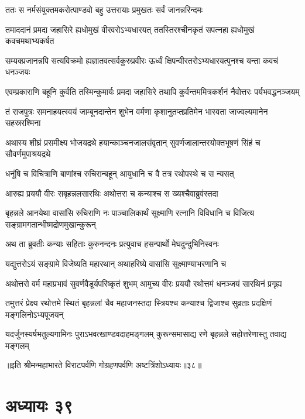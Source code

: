 
\twolineshloka
{ततः स नर्मसंयुक्तमकरोत्पाण्डवो बहु}
{उत्तरायाः प्रमुखतः सर्वं जानन्नरिन्दमः}


\twolineshloka
{तमाददानं प्रमदा जहासिरे ह्यधोमुखं वीरवरोऽभ्यधारयत्}
{ततस्तिरश्चीनकृतं सपत्नहा ह्यधोमुखं कवचमथाभ्यकर्षत}


\twolineshloka
{सम्यक्प्रजानन्नपि सत्यविक्रमो ह्यज्ञातवत्सर्वकुरुप्रवीरः}
{ऊर्ध्वं क्षिपन्वीरतरोऽभ्यधारयत्पुनश्च यन्ता कवचं धनञ्जयः}


\twolineshloka
{एवम्प्रकाराणि बहूनि कुर्वति तस्मिन्कुमार्यः प्रमदा जहासिरे}
{तथापि कुर्वन्तममित्रकर्शनं नैवोत्तरः पर्यभवद्धनञ्जयम्}


\twolineshloka
{तं राजपुत्रः समनाहयत्स्वयं जाम्बूनदान्तेन शुभेन वर्मणा}
{कृशानुतप्तप्रतिमेन भास्वता जाज्वल्यमानेन सहस्ररश्मिना}


\twolineshloka
{अथास्य शीघ्रं प्रसमीक्ष्य भोजयद्रथे हयान्काञ्चनजालसंवृतान्}
{सुवर्णजालान्तरयोक्तभूषणं सिंहं च सौवर्णमुपाश्रयद्रथे}


\twolineshloka
{धनूंषि च विचित्राणि बाणांश्च रुचिरान्बहून्}
{आयुधानि च वै तत्र रथोपस्थे च स न्यसत्}


\twolineshloka
{आरुह्य प्रययौ वीरः सबृहन्नलसारथिः}
{अथोत्तरा च कन्याश्च स ख्यश्चैवाब्रुवंस्तदा}


\threelineshloka
{बृहन्नले आनयेथा वासांसि रुचिराणि नः}
{पाञ्चालिकार्थं सूक्ष्माणि रत्नानि विविधानि च}
{विजित्य सङ्ग्रामगतान्भीष्मद्रोणमुखान्कुरून्}


\twolineshloka
{अथ ता ब्रुवतीः कन्याः सहिताः कुरुनन्दनः}
{प्रत्युवाच हसन्पार्थो मेघदुन्दुभिनिस्वनः}


\twolineshloka
{यद्युत्तरोऽयं सङ्ग्रामे विजेष्यति महारथान्}
{अथाहरिष्ये वासांसि सूक्ष्माण्याभरणानि च}



\twolineshloka
{अथोत्तरो वर्म महाप्रभावं सुवर्णवैडूर्यपरिष्कृतं शुभम्}
{आमुच्य वीरः प्रययौ रथोत्तमं धनञ्जयं सारथिनं प्रगृह्य}


\twolineshloka
{तमुत्तरं प्रेक्ष्य रथोत्तमे स्थितं बृहन्नलां चैव महाजनस्तदा}
{स्त्रियश्च कन्याश्च द्विजाश्च सुव्रताः प्रदक्षिणं मङ्गलिनोऽभ्यपूजयन्}


\twolineshloka
{यदर्जुनस्यर्षभतुल्यगामिनः पुराऽभवत्खाण्डवदाहमङ्गलम्}
{कुरून्समासाद्य रणे बृहन्नले सहोत्तरेणास्तु तवाद्य मङ्गलम्}

॥इति श्रीमन्महाभारते विराटपर्वणि गोग्रहणपर्वणि अष्टत्रिंशोऽध्यायः॥३८॥

\chapter{अध्यायः ३९}

